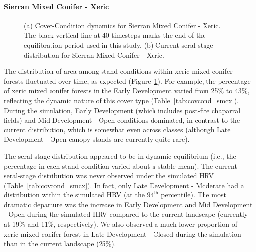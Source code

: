 \clearpage
\paragraph{Sierran Mixed Conifer - Xeric}

\begin{figure}[!htbp]
  \centering
  \caption{(a) Cover-Condition dynamics for Sierran Mixed Conifer - Xeric. The black vertical line at 40 timesteps marks the end of the equilibration period used in this study. (b) Current seral stage distribution for Sierran Mixed Conifer - Xeric.} 
  \label{fig:covcond_smcx}
\end{figure}

The distribution of area among stand conditions within xeric mixed conifer forests fluctuated over time, as expected (Figure~\ref{fig:covcond_smcx}). For example, the percentage of xeric mixed conifer forests in the Early Development varied from 25\% to 43\%, reflecting the dynamic nature of this cover type (Table~\ref{tab:covcond_smcx}). During the simulation, Early Development (which includes post-fire chaparral fields) and Mid Development - Open conditions dominated, in contrast to the current distribution, which is somewhat even across classes (although Late Development - Open canopy stands are currently quite rare).  %

The seral-stage distribution appeared to be in dynamic equilibrium (i.e., the percentage in each stand condition varied about a stable mean). The current seral-stage distribution was never observed under the simulated HRV (Table~\ref{tab:covcond_smcx}). In fact, only Late Development - Moderate had a distribution within the simulated HRV (at the $94^{\text{th}}$ percentile). The most dramatic departure was the increase in Early Development and Mid Development - Open during the simulated HRV compared to the current landscape (currently at 19\% and 11\%, respectively). We also observed a much lower proportion of xeric mixed conifer forest in Late Development - Closed during the simulation than in the current landscape (25\%). 

